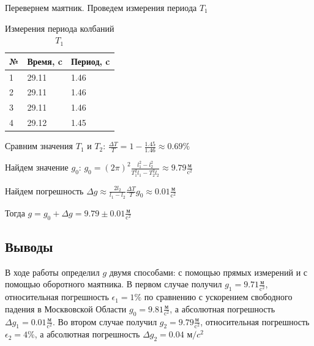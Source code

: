 \documentclass[a4paper, 12pt]{article}
\begin{document}
\begin{center}
\begin{table}[H]
\end{table}

Перевернем маятник. Проведем измерения периода $T_{1}$

\begin{table}[H]
    \centering
    \begin{tabular}{|l|l|l|} \hline
        № & Время, c & Период, c  \\ \hline
        1 & 29.11 & 1.46  \\ \hline
        2 & 29.11 & 1.46  \\ \hline
        3 & 29.11 & 1.46  \\ \hline
        4 & 29.12 & 1.45  \\ \hline
    \end{tabular}
    \caption{Измерения периода колбаний $T_{1}$}
\end{table}

Сравним значения $T_{1}$ и $T_{2}$: $\frac{\varDelta T}{T} = 1 - \frac{1.45}{1.46} \approx 0.69\%$\\

\bigskip

Найдем значение $g_{0}$: $g_{0} = (2\pi)^2\frac{l_{1}^2-l_{2}^2}{T_{1}^2l_{1} - T_{2}^2l_{2}} \approx 9.79 \frac{\text{м}}{\text{c}^2}$\\

\bigskip

Найдем погрешность $\varDelta g \approx \frac{2l_{2}}{l_{1}-l_{2}} \frac{\varDelta T}{T} g_{0} \approx 0.01 \frac{\text{м}}{\text{c}^2}$\\

\bigskip

Тогда $g = g_{0} + \varDelta g = 9.79 \pm 0.01 \frac{\text{м}}{\text{c}^2}$
\end{center}

\begin{center}
    
\section*{Выводы}
В ходе работы определил $g$ двумя способами: с помощью прямых измерений и с помощью оборотного маятника. В первом случае получил $g_{1} = 9.71 \frac{\text{м}}{\text{c}^2}$, относительная погрешность $\epsilon_{1} = 1\%$ по сравнению с ускорением свободного падения в Москвовской Области $g_{0} = 9.81 \frac{\text{м}}{\text{c}^2}$, а абсолютная погрешность $\varDelta g_{1} = 0.01\frac{\text{м}}{\text{c}^2}$.
Во втором случае получил $g_{2} = 9.79 \frac{\text{м}}{\text{c}^2}$, относительная погрешность $\epsilon_{2} = 4\%$, а абсолютная погрешность $\varDelta g_{2} = 0.04$ м$/c^2$

\end{center}
\end{document}
